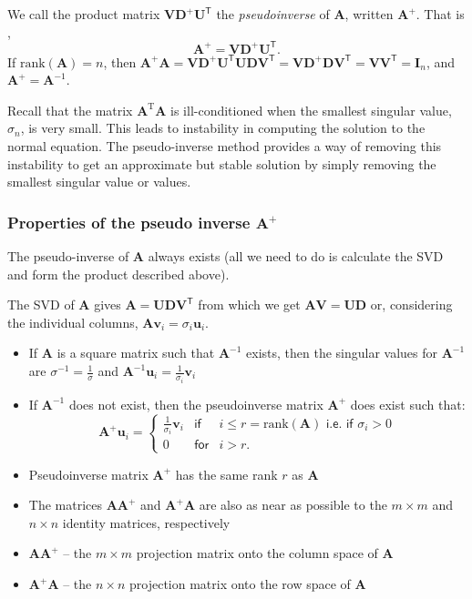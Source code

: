 We call the product matrix $ \mathbf{V}\mathbf{D}^{+}\mathbf{U}^\mathsf{T}$ the  {\em pseudoinverse} of $\mathbf A$, written $\mathbf A^+$.  That is ,
\[
\mathbf{A}^{+} = \mathbf{V}\mathbf{D}^{+}\mathbf{U}^\mathsf{T}.
\]
If $\mathrm {rank}(\mathbf A) = n$, then  $
  \mathbf{A}^+\mathbf{A} = 
  \mathbf{V}{\mathbf{D}^{+}{\mathbf{U}^\mathsf{T}\mathbf{U}}\mathbf{D}}\mathbf{V}^\mathsf{T}  = \mathbf{V}{\mathbf{D}^{+}\mathbf{D}}\mathbf{V}^\mathsf{T} = \mathbf{V}\mathbf{V}^\mathsf{T} = \mathbf{I}_n$, and $\mathbf A^+ = \mathbf A^{-1}$.
 
 
Recall  that the matrix $\mathbf A^ \mathrm T \mathbf A$ is ill-conditioned when the smallest singular value, $\sigma_n$, is very small.  This leads to  instability in computing the solution to the normal equation.  The pseudo-inverse method provides a way of removing this instability to get an approximate but stable solution by simply removing the smallest singular value or values.  
 
 
 
 \subsubsection{Properties of the pseudo inverse $\mathbf A^+$}

The pseudo-inverse of $\mathbf A$ always exists (all we need to do is calculate the SVD and form the product described above).
 
 The SVD of $\mathbf A$ gives $ \mathbf{A} = \mathbf{UDV}^\mathsf{T}$ from which we get  $\mathbf{AV} = \mathbf{UD}$ or, considering the individual columns,  
$\mathbf{Av}_i = \sigma_i\mathbf{u}_i$.
\begin{itemize}
\item If $\mathbf{A}$ is a square matrix such that $\mathbf{A}^{-1}$ exists, then the singular values for 
$\mathbf{A}^{-1}$ are $\sigma^{-1}=\frac{1}{\sigma}$  and $\mathbf{A}^{-1}\mathbf{u}_i =\frac{1}{\sigma_i}\mathbf{v}_i$ 
\item If $\mathbf{A}^{-1}$  does not exist, then the {pseudoinverse} matrix $\mathbf{A}^{+}$ does exist such that: 
\[
\mathbf{A}^{+}\mathbf{u}_i =\left\{\begin{array}{lll}
 \frac{1}{\sigma_i}\mathbf{v}_i & \textsf{if}  & i \le r = \mathrm{rank}(\mathbf{A}) \textsf{  i.e. if   } \sigma_i > 0\\
 0                                                  & \textsf{for} & i > r.
 \end{array}
\right.
\]
\item Pseudoinverse matrix $\mathbf{A}^{+}$ has the same rank $r$ as $\mathbf{A}$
\item The matrices $\mathbf{AA}^{+}$  and $\mathbf{A}^{+}\mathbf{A}$  are also as near as possible to the $m\times m$ and $n\times n$  identity matrices, respectively
\item $\mathbf{AA}^{+}$ -- the $m\times m$ projection matrix onto the column space of $\mathbf{A}$
\item $\mathbf{A}^{+}\mathbf{A}$ -- the $n\times n$ projection matrix onto the row space of $\mathbf{A}$
\end{itemize}


